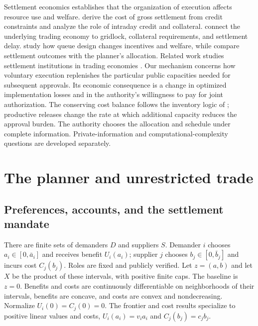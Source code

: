 \documentclass[ecta,draft]{econsocart}
\theoremstyle{definition}
\theoremstyle{definition}
\begin{document}
Settlement economics establishes that the organization of execution affects
resource use and welfare. \citet{KahnRoberds2001} derive the cost of gross
settlement from credit constraints and analyze the role of intraday credit
and collateral. \citet{KahnMcAndrewsRoberds2003} connect the underlying trading
economy to gridlock, collateral requirements, and settlement delay.
\citet{MartinMcAndrews2008} study how queue design changes incentives and
welfare, while \citet{AtalayMartinMcAndrews2010} compare settlement outcomes
with the planner's allocation. Related work studies settlement institutions
in trading economies \citep{KoepplMonnetTemzelides2008}.
Our mechanism concerns how voluntary execution replenishes the particular
public capacities needed for subsequent approvals. Its economic consequence
is a change in optimized implementation losses and in the authority's
willingness to pay for joint authorization. The conserving cost balance
follows the inventory logic of \citet{Baumol1952}; productive releases change
the rate at which additional capacity reduces the approval burden.
The authority chooses the allocation and schedule under complete information.
Private-information and computational-complexity questions are developed
separately.

\section{The planner and unrestricted trade}
\label{sec:planner}

\subsection{Preferences, accounts, and the settlement mandate}

There are finite sets of demanders $D$ and suppliers $S$. Demander $i$ chooses
$a_i\in[0,\bar a_i]$ and receives benefit $U_i(a_i)$; supplier $j$ chooses
$b_j\in[0,\bar b_j]$ and incurs cost $C_j(b_j)$. Roles are fixed and publicly
verified. Let $z=(a,b)$ and let $X$ be the product of these intervals, with
positive finite caps. The baseline is $z=0$. Benefits and costs are continuously
differentiable on neighborhoods of their intervals, benefits are concave,
and costs are convex and nondecreasing. Normalize
$U_i(0)=C_j(0)=0$. The frontier and cost results specialize to positive linear
values and costs, $U_i(a_i)=v_i a_i$ and $C_j(b_j)=c_jb_j$.
\end{document}
